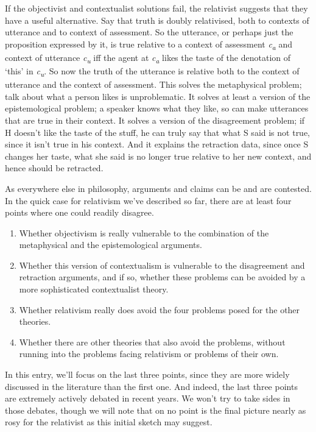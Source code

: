 \documentclass[
  10pt,
  letterpaper,
  DIV=11,
  numbers=noendperiod,
  twoside]{scrartcl}
\providecommand{\tightlist}{%
  \setlength{\itemsep}{0pt}\setlength{\parskip}{0pt}}\usepackage{longtable,booktabs,array}
\begin{document}
If the objectivist and contextualist solutions fail, the relativist
suggests that they have a useful alternative. Say that truth is doubly
relativised, both to contexts of utterance and to context of assessment.
So the utterance, or perhaps just the proposition expressed by it, is
true relative to a context of assessment \emph{c\textsubscript{a}} and
context of utterance \emph{c\textsubscript{u}} iff the agent at
\emph{c\textsubscript{a}} likes the taste of the denotation of `this' in
\emph{c\textsubscript{u}}. So now the truth of the utterance is relative
both to the context of utterance and the context of assessment. This
solves the metaphysical problem; talk about what a person likes is
unproblematic. It solves at least a version of the epistemological
problem; a speaker knows what they like, so can make utterances that are
true in their context. It solves a version of the disagreement problem;
if H doesn't like the taste of the stuff, he can truly say that what S
said is not true, since it isn't true in his context. And it explains
the retraction data, since once S changes her taste, what she said is no
longer true relative to her new context, and hence should be retracted.

As everywhere else in philosophy, arguments and claims can be and are
contested. In the quick case for relativism we've described so far,
there are at least four points where one could readily disagree.

\begin{enumerate}
\def\labelenumi{\arabic{enumi}.}
\tightlist
\item
  Whether objectivism is really vulnerable to the combination of the
  metaphysical and the epistemological arguments.
\item
  Whether this version of contextualism is vulnerable to the
  disagreement and retraction arguments, and if so, whether these
  problems can be avoided by a more sophisticated contextualist theory.
\item
  Whether relativism really does avoid the four problems posed for the
  other theories.
\item
  Whether there are other theories that also avoid the problems, without
  running into the problems facing relativism or problems of their own.
\end{enumerate}

In this entry, we'll focus on the last three points, since they are more
widely discussed in the literature than the first one. And indeed, the
last three points are extremely actively debated in recent years. We
won't try to take sides in those debates, though we will note that on no
point is the final picture nearly as rosy for the relativist as this
initial sketch may suggest.
\end{document}
